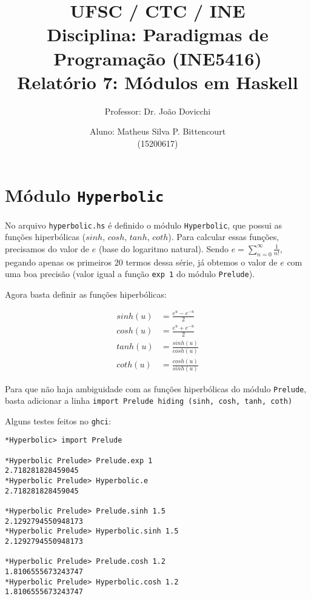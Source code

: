 \documentclass[a4paper,twocolumn,10pt]{article}
\begin{document}
\title{
	\large \rm UFSC / CTC / INE\\
	\large \rm Disciplina: Paradigmas de Programação (INE5416)\\
	\Large \bf Relatório 7: Módulos em Haskell
}

\author{
	Professor: Dr. João Dovicchi\\
	\and
	Aluno: Matheus Silva P. Bittencourt\\(15200617)
}

\maketitle

\thispagestyle{empty} %

\section*{Módulo \texttt{Hyperbolic}}

No arquivo \texttt{hyperbolic.hs} é definido o módulo \texttt{Hyperbolic}, que
possui as funções hiperbólicas ($sinh$, $cosh$, $tanh$, $coth$). Para calcular
essas funções, precisamos do valor de $e$ (base do logaritmo natural).  Sendo
$e = \sum_{n=0}^{\infty} \frac{1}{n!}$, pegando apenas os primeiros $20$ termos
dessa série, já obtemos o valor de $e$ com uma boa precisão (valor igual a
função \texttt{exp 1} do módulo \texttt{Prelude}).

Agora basta definir as funções hiperbólicas:

\begin{align*}
	sinh(u) &= \frac{e^u - e ^{-u}}{2} \\
	cosh(u) &= \frac{e^u + e ^{-u}}{2} \\
	tanh(u) &= \frac{sinh(u)}{cosh(u)} \\
	coth(u) &= \frac{cosh(u)}{sinh(u)}
\end{align*}

Para que não haja ambiguidade com as funções hiperbólicas do módulo
\texttt{Prelude}, basta adicionar a linha \texttt{import Prelude hiding (sinh,
cosh, tanh, coth)}

Alguns testes feitos no \texttt{ghci}:

\begin{verbatim}
*Hyperbolic> import Prelude

*Hyperbolic Prelude> Prelude.exp 1
2.718281828459045
*Hyperbolic Prelude> Hyperbolic.e
2.718281828459045

*Hyperbolic Prelude> Prelude.sinh 1.5
2.1292794550948173
*Hyperbolic Prelude> Hyperbolic.sinh 1.5
2.1292794550948173

*Hyperbolic Prelude> Prelude.cosh 1.2
1.8106555673243747
*Hyperbolic Prelude> Hyperbolic.cosh 1.2
1.8106555673243747
\end{verbatim}
\end{document}

